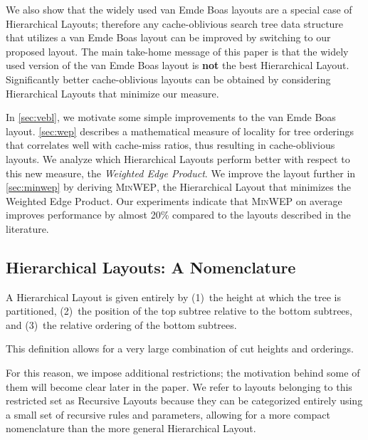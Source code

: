 \documentclass[10pt,conference,letterpaper]{IEEEtran}
\newcommand{\note}[1]{}
\newcommand{\comment}[1]{}
\newcommand{\vEBl}{van Emde Boas layout\xspace}
\newcommand{\vEBls}{van Emde Boas layouts\xspace}
\newcommand{\HL}{Hierarchical Layout\xspace}
\newcommand{\HLs}{Hierarchical Layouts\xspace}
\newcommand{\RLs}{Recursive Layouts\xspace}
\newcommand{\WEP}{Weighted Edge Product\xspace}
\newcommand{\minwep}{\textsc{MinWEP}\xspace}
\begin{document}
We also show that the widely used \vEBls are a
special case of \HLs; therefore any cache-oblivious search tree data structure that utilizes a \vEBl can be improved by switching to our proposed layout. The main take-home message of this paper is that the widely used version of the \vEBl is {\bf not} the best \HL. Significantly better cache-oblivious layouts can be obtained by considering \HLs that minimize our measure.

\comment{describe some notation that allows us to characterize all \HLs, and}
In \autoref{sec:vebl}, we 
motivate some simple improvements to the \vEBl. \autoref{sec:wep} describes a mathematical measure of locality for tree orderings that correlates well with cache-miss ratios, thus resulting in cache-oblivious layouts. We analyze which \HLs perform better with respect to this new measure, the \emph{Weighted Edge Product}. We improve the layout further in \autoref{sec:minwep} by deriving \minwep, the \HL that minimizes the \WEP. Our experiments indicate that \minwep on average improves performance by almost 20\% compared to the layouts described in the literature.

\subsection{\HLs: A Nomenclature}

\comment{
Recall that 
}
A \HL is
given entirely by (1)~the height at which the tree is partitioned, 
(2)~the position of the top subtree relative to the bottom subtrees, and (3)~the relative ordering of the bottom subtrees.  
\note{We can't represent all \HLs using our notation (only pre and in). \HLs restricted.}
This definition allows for a very large combination of cut heights and orderings.
\comment{many of which do not yield cache-oblivious layouts.}
For this reason, we impose additional restrictions; the motivation behind some of them will become clear later in the paper. We refer to layouts belonging to this restricted set as \RLs because they can be 
categorized entirely using a small set of recursive rules and parameters, allowing for a more compact nomenclature
than the more general \HL.
\comment{
would be possible for 
}
\end{document}

